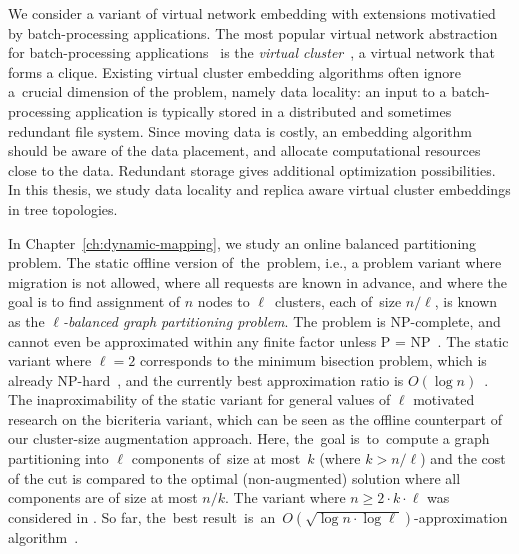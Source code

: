 We consider a variant of virtual network embedding with extensions motivatied by batch-processing applications.
The most popular virtual network abstraction for batch-processing applications~\cite{mapreduce} is the \emph{virtual cluster}~\cite{oktopus,talk-about,infocom16,ccr15emb,proteus}, a virtual network that forms a clique.
Existing virtual cluster embedding algorithms often ignore a~crucial dimension of the problem, namely data locality:
an input to a batch-processing application is typically stored in a distributed
and sometimes redundant file system. Since moving
data is costly, an embedding algorithm should be aware of the data placement,
and allocate computational resources close to the data.
Redundant storage gives additional optimization possibilities.
In this thesis, we study data locality and replica aware virtual cluster embeddings in tree topologies.

\medskip

In Chapter~\ref{ch:dynamic-mapping}, we study an online balanced partitioning problem.
The static offline version of~the~problem, i.e., a problem variant where
migration is not allowed, where all requests are known in advance, and where
the goal is to find assignment of $n$ nodes to $\ell$~clusters, each of~size $n/\ell$, is known as the
\emph{$\ell$-balanced graph partitioning problem}. The problem is 
NP-complete, and cannot even be approximated within any finite factor unless P
= NP~\cite{AndRae06}.  The static
variant where $\ell = 2$ corresponds to the minimum bisection problem, which
is already NP-hard~\cite{GaJoSt76}, and 
the currently best approximation ratio is $O(\log n)$~\cite{SarVaz95,ArKaKa99,FeKrNi00,FeiKra02,KraFei06,Raec08}.
The inaproximability of the static variant for general values of $\ell$
motivated research on the bicriteria variant, which can be seen as the offline
counterpart of our cluster-size augmentation approach. Here, the~goal
is~to~compute a graph partitioning into $\ell$ components of~size at most~$k$ (where $k > n/\ell$) and the cost of the cut is compared to the optimal (non-augmented)
solution where all components are of size at most $n/k$. The variant where
$n \geq 2 \cdot k \cdot \ell$ was considered in
\cite{LeMaTr90,SimTen97,EvNaRS00,EvNaRS99,KrNaSc09}. So far, the~best result~is~an~$O(\!\sqrt{\log n \cdot \log \ell})$-approximation algorithm~\cite{KrNaSc09}.

